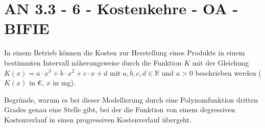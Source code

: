\section{AN 3.3 - 6 - Kostenkehre - OA - BIFIE}

\begin{beispiel}[AN 3.3]{1} %
In einem Betrieb können die Kosten zur Herstellung eines Produkts in einem bestimmten Intervall näherungsweise durch die Funktion $K$ mit der Gleichung \mbox{$K(x) = a \cdot x^3 + b\cdot x^2 + c \cdot x + d$}
mit $a, b, c, d \in \mathbb{R}$ und $a > 0$ beschrieben werden ($K(x)$ in \euro, $x$ in mg). 

Begründe, warum es bei dieser Modellierung durch eine Polynomfunktion dritten Grades genau eine Stelle gibt, bei der die Funktion von einem degressiven Kostenverlauf in einen progressiven Kostenverlauf übergeht.

\end{beispiel}